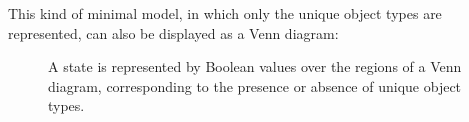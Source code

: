 \documentclass[floatsintext, doc]{apa6}
\def\firstcircle{(90:1cm) circle (1.5cm)}
\def\secondcircle{(210:1cm) circle (1.5cm)}
\def\thirdcircle{(330:1cm) circle (1.5cm)}
\begin{document}
This kind of minimal model, in which only the unique object types are represented, can also be displayed as a Venn diagram: 


\begin{figure}[h]
\centering
\label{fig:venn}
\caption{A state is represented by Boolean values over the regions of a Venn diagram, corresponding to the presence or absence of unique object types.}
\end{figure}



\end{document}
